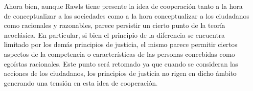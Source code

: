 Ahora bien, aunque Rawls tiene presente la idea de cooperación tanto a la hora de conceptualizar a las sociedades como a la hora conceptualizar a los ciudadanos como racionales y razonables, parece persistir un cierto punto de la teoría neoclásica. En particular, si bien el principio de la diferencia se encuentra limitado por los demás principios de justicia, el mismo parece permitir ciertos aspectos de la competencia o características de las personas concebidas como egoístas racionales. Este punto será retomado \citet{Cohen_2001} ya que cuando se consideran las acciones de los ciudadanos, los principios de justicia no rigen en dicho ámbito generando una tensión en esta idea de cooperación.
